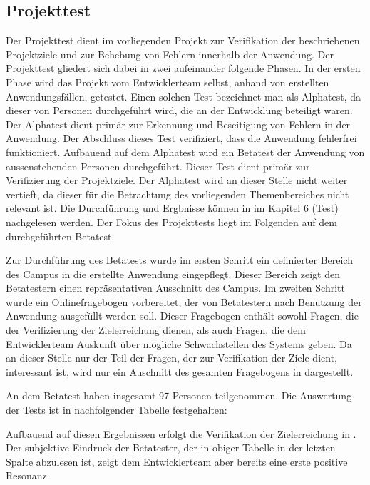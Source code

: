 \subsection{Projekttest}
\label{sec:Projekttest}

Der Projekttest dient im vorliegenden Projekt zur Verifikation der beschriebenen
Projektziele und zur Behebung von Fehlern innerhalb der Anwendung. Der
Projekttest gliedert sich dabei in zwei aufeinander folgende Phasen. In der
ersten Phase wird das Projekt vom Entwicklerteam selbst, anhand von erstellten
Anwendungsfällen, getestet. Einen solchen Test bezeichnet man als Alphatest, da
dieser von Personen durchgeführt wird, die an der Entwicklung beteiligt waren.
Der Alphatest dient primär zur Erkennung und Beseitigung von Fehlern in der
Anwendung. Der Abschluss dieses Test verifiziert, dass die Anwendung fehlerfrei
funktioniert. Aufbauend auf dem Alphatest wird ein Betatest der Anwendung von
aussenstehenden Personen durchgeführt. Dieser Test dient primär zur
Verifizierung der Projektziele. Der Alphatest wird an dieser Stelle nicht weiter
vertieft, da dieser für die Betrachtung des vorliegenden Themenbereiches nicht
relevant ist. Die Durchführung und Ergbnisse können in
\citet{modelierungUndBetrieb2014} im Kapitel 6 (Test) nachgelesen werden. Der
Fokus des Projekttests liegt im Folgenden auf dem durchgeführten Betatest.

Zur Durchführung des Betatests wurde im ersten Schritt ein definierter Bereich
des Campus in die erstellte Anwendung eingepflegt. Dieser Bereich zeigt den
Betatestern einen repräsentativen Ausschnitt des Campus.
Im zweiten Schritt wurde ein Onlinefragebogen vorbereitet, der von Betatestern
nach Benutzung der Anwendung ausgefüllt werden soll. Dieser Fragebogen enthält 
sowohl Fragen, die der Verifizierung der Zielerreichung dienen, als auch
Fragen, die dem Entwicklerteam Auskunft über mögliche Schwachstellen des Systems geben.
Da an dieser Stelle nur der Teil der Fragen, der zur Verifikation der Ziele dient,
interessant ist, wird nur ein Auschnitt des gesamten Fragebogens in dargestellt.

An dem Betatest haben insgesamt 97 Personen teilgenommen. Die Auswertung der Tests ist in nachfolgender Tabelle
festgehalten:

\clearpage
{}

Aufbauend auf diesen Ergebnissen erfolgt die Verifikation der Zielerreichung in .
Der subjektive Eindruck der Betatester, der in obiger Tabelle in der letzten Spalte abzulesen ist,
zeigt dem Entwicklerteam aber bereits eine erste positive Resonanz.